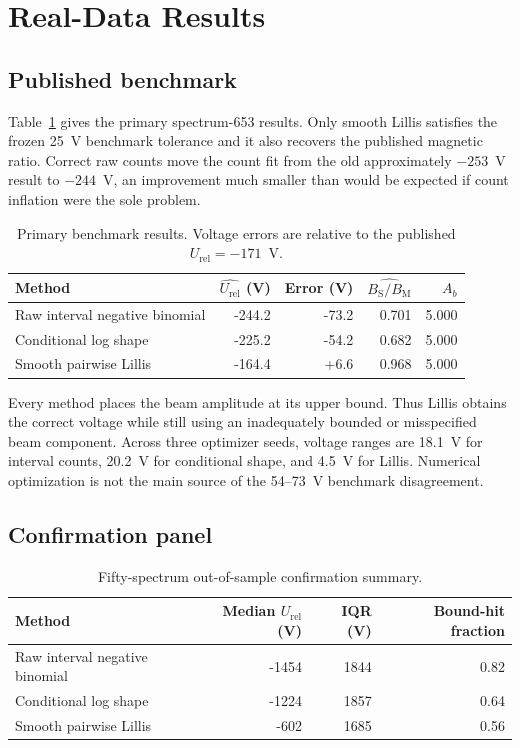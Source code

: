 \documentclass[11pt]{article}
\newcommand{\Urel}{U_{\mathrm{rel}}}
\newcommand{\BSBM}{B_{\mathrm{S}}/B_{\mathrm{M}}}
\begin{document}
\section{Real-Data Results}

\subsection{Published benchmark}

Table~\ref{tab:benchmark} gives the primary spectrum-653 results.  Only smooth
Lillis satisfies the frozen 25~V benchmark tolerance and it also recovers the
published magnetic ratio.  Correct raw counts move the count fit from the old
approximately $-253$~V result to $-244$~V, an improvement much smaller than
would be expected if count inflation were the sole problem.

\begin{table}[ht]
\centering
\caption{Primary benchmark results.  Voltage errors are relative to the
published $\Urel=-171$~V.}
\label{tab:benchmark}
\begin{tabular}{lrrrr}
\toprule
Method & $\widehat{\Urel}$ (V) & Error (V) & $\widehat{\BSBM}$ & $A_b$ \\
\midrule
Raw interval negative binomial & -244.2 & -73.2 & 0.701 & 5.000 \\
Conditional log shape & -225.2 & -54.2 & 0.682 & 5.000 \\
Smooth pairwise Lillis & -164.4 & +6.6 & 0.968 & 5.000 \\
\bottomrule
\end{tabular}
\end{table}

Every method places the beam amplitude at its upper bound.  Thus Lillis obtains
the correct voltage while still using an inadequately bounded or misspecified
beam component.  Across three optimizer seeds, voltage ranges are 18.1~V for
interval counts, 20.2~V for conditional shape, and 4.5~V for Lillis.  Numerical
optimization is not the main source of the 54--73~V benchmark disagreement.

\subsection{Confirmation panel}

\begin{table}[ht]
\centering
\caption{Fifty-spectrum out-of-sample confirmation summary.}
\label{tab:confirmation}
\begin{tabular}{lrrr}
\toprule
Method & Median $\Urel$ (V) & IQR (V) & Bound-hit fraction \\
\midrule
Raw interval negative binomial & -1454 & 1844 & 0.82 \\
Conditional log shape & -1224 & 1857 & 0.64 \\
Smooth pairwise Lillis & -602 & 1685 & 0.56 \\
\bottomrule
\end{tabular}
\end{table}
\end{document}
